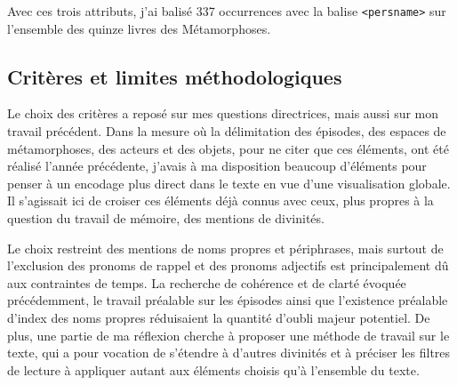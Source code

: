 \documentclass[
  letterpaper,
  DIV=11,
  numbers=noendperiod]{scrreprt}
\begin{document}
Avec ces trois attributs, j'ai balisé 337 occurrences avec la balise
\texttt{\textless{}persname\textgreater{}} sur l'ensemble des quinze
livres des Métamorphoses.

\subsection{Critères et limites
méthodologiques}\label{crituxe8res-et-limites-muxe9thodologiques}

Le choix des critères a reposé sur mes questions directrices, mais aussi
sur mon travail précédent. Dans la mesure où la délimitation des
épisodes, des espaces de métamorphoses, des acteurs et des objets, pour
ne citer que ces éléments, ont été réalisé l'année précédente, j'avais à
ma disposition beaucoup d'éléments pour penser à un encodage plus direct
dans le texte en vue d'une visualisation globale. Il s'agissait ici de
croiser ces éléments déjà connus avec ceux, plus propres à la question
du travail de mémoire, des mentions de divinités.

Le choix restreint des mentions de noms propres et périphrases, mais
surtout de l'exclusion des pronoms de rappel et des pronoms adjectifs
est principalement dû aux contraintes de temps. La recherche de
cohérence et de clarté évoquée précédemment, le travail préalable sur
les épisodes ainsi que l'existence préalable d'index des noms propres
réduisaient la quantité d'oubli majeur potentiel. De plus, une partie de
ma réflexion cherche à proposer une méthode de travail sur le texte, qui
a pour vocation de s'étendre à d'autres divinités et à préciser les
filtres de lecture à appliquer autant aux éléments choisis qu'à
l'ensemble du texte.
\end{document}
